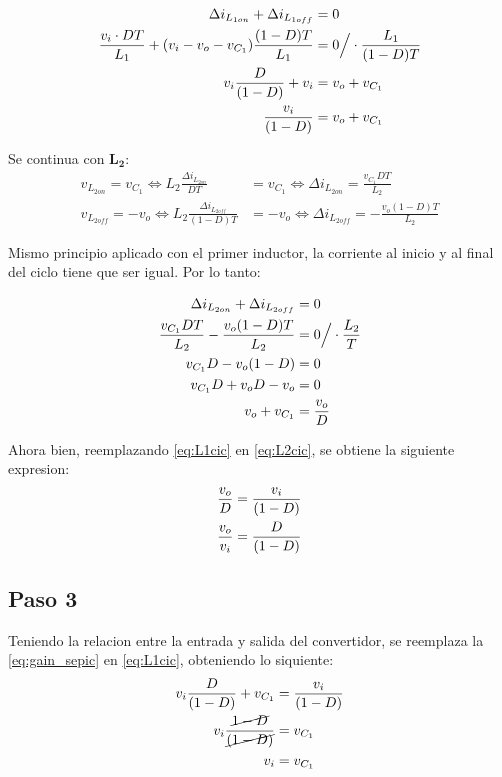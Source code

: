 \begin{align}
	\Delta i_{L_{1on}} + \Delta i_{L_{1off}} &= 0 \notag\\ 
	\frac{v_i \cdot DT}{L_1}+(v_i-v_{o}-v_{C_1})\frac{(1-D)T}{L_1}&=0 \Big/ \cdot \frac{L_1}{(1-D)T} \notag\\ 
	v_i \frac{D}{(1-D)}+v_i&=v_o+v_{C_1} \notag\\ 
	\frac{v_i}{(1-D)}&=v_o+v_{C_1} \label{eq:L1cic}
\end{align}

\newpage
Se continua con $\mathbf{L_2}$:
\begin{align*}
	v_{L_{2on}}=v_{C_1} \iff L_2 \frac{\Delta i_{L_{2on}}}{DT}&=v_{C_1} \iff \Delta i_{L_{2on}}=\frac{v_{C_1}DT}{L_2} \\ 
    v_{L_{2off}}=-v_o \iff L_2 \frac{\Delta i_{L_{2off}}}{(1-D)T}&=-v_o \iff \Delta i_{L_{2off}}= -\frac{v_o(1-D)T}{L_2}
\end{align*}

Mismo principio aplicado con el primer inductor, la corriente al inicio y al final del ciclo tiene que ser igual. Por lo tanto:

\begin{align}
    \Delta i_{L_{2on}}+\Delta i_{L_{2off}}&=0  \notag\\
    \frac{v_{C_1}DT}{L_2}-\frac{v_o(1-D)T}{L_2}&=0 \Big/ \cdot \frac{L_2}{T}  \notag\\ 
    v_{C_1}D-v_o(1-D)&=0 \notag\\ 
    v_{C_1}D+v_oD-v_o&=0 \notag\\
    v_o+v_{C_1}&=\frac{v_o}{D} \label{eq:L2cic}
\end{align}

Ahora bien, reemplazando \autoref{eq:L1cic} en \autoref{eq:L2cic}, se obtiene la siguiente expresion:
\begin{align}
    \frac{v_o}{D}&=\frac{v_i}{(1-D)} \notag \\
    \frac{v_o}{v_i}&=\frac{D}{(1-D)} \label{eq:gain_sepic}
\end{align}

\subsection{Paso 3}

Teniendo la relacion entre la entrada y salida del convertidor, se reemplaza la \autoref{eq:gain_sepic} en \autoref{eq:L1cic},
obteniendo lo siquiente:
\begin{align*}
    v_i\frac{D}{(1-D)}+v_{C_1}&=\frac{v_i}{(1-D)} \\ 
    v_i \frac{\cancel{1-D}}{\cancel{(1-D)}}&=v_{C_1} \\ 
    v_i&=v_{C_1}
\end{align*}

